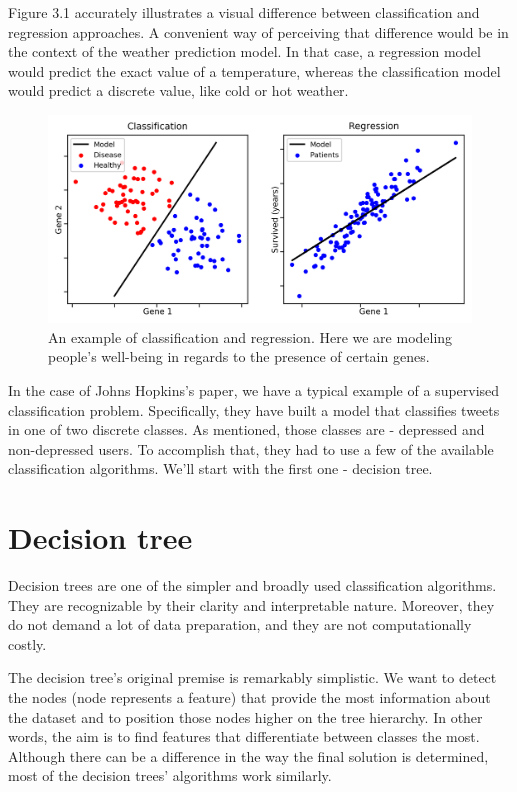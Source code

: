 \documentclass[times, utf8, seminar]{fer}
\begin{document}
Figure 3.1 accurately illustrates a visual difference between classification and regression approaches. A convenient way of perceiving that difference would be in the context of the weather prediction model. In that case, a regression model would predict the exact value of a temperature, whereas the classification model would predict a discrete value, like cold or hot weather.

\begin{figure}[h]
	\centering
	\includegraphics[width=14cm]{classification}
	\caption{An example of classification and regression. Here we are modeling people's well-being in regards to the presence of certain genes. \protect \footnotemark}
\end{figure}


In the case of Johns Hopkins's paper, we have a typical example of a supervised classification problem. Specifically, they have built a model that classifies tweets in one of two discrete classes. As mentioned, those classes are - depressed and non-depressed users. To accomplish that, they had to use a few of the available classification algorithms. We'll start with the first one - decision tree.

\newpage

\section{Decision tree}

Decision trees are one of the simpler and broadly used classification algorithms. They are recognizable by their clarity and interpretable nature. Moreover, they do not demand a lot of data preparation, and they are not computationally costly. 

The decision tree's original premise is remarkably simplistic. We want to detect the nodes (node represents a feature) that provide the most information about the dataset and to position those nodes higher on the tree hierarchy. In other words, the aim is to find features that differentiate between classes the most. Although there can be a difference in the way the final solution is determined, most of the decision trees' algorithms work similarly.
\end{document}
